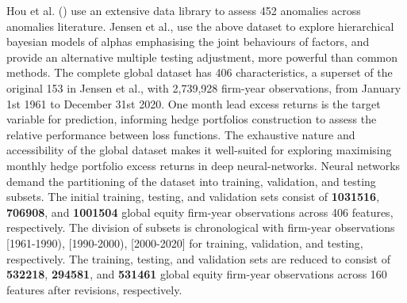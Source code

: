 Hou et al. (\citeyear{hou2020replicating}) use an extensive data library to assess 452 anomalies across anomalies literature.
Jensen et al., \citeyear{jensen2021there} use the above dataset to explore hierarchical bayesian models of alphas emphasising the joint behaviours of factors, 
and provide an alternative multiple testing adjustment, more powerful than common methods.
The complete global dataset has 406 characteristics, a superset of the original 153 in Jensen et al., with 2,739,928 firm-year observations, from January 1st 1961 to December 31st 2020.
One month lead excess returns is the target variable for prediction, informing hedge portfolios construction to assess the relative performance between loss functions.
The exhaustive nature and accessibility of the global dataset makes it well-suited for exploring maximising monthly hedge portfolio excess returns in deep neural-networks.
Neural networks demand the partitioning of the dataset into training, validation, and testing subsets.
The initial training, testing, and validation sets consist of \textbf{1031516}, \textbf{706908}, and \textbf{1001504} global equity firm-year observations across 406 features, respectively.
The division of subsets is chronological with firm-year observations [1961-1990), [1990-2000), [2000-2020] for training, validation, and testing, respectively.
The training, testing, and validation sets are reduced to consist of \textbf{532218}, \textbf{294581}, and \textbf{531461} global equity firm-year observations across 160 features after revisions, respectively.


